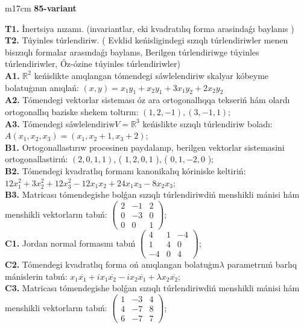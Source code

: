 \documentclass{article}
\begin{document}
\begin{tabular}{m{17cm}}
\textbf{85-variant}
\newline

\textbf{T1.} İnertsiya nızamı. (invariantlar,  eki kvadratılıq forma arasindaǵı baylanıs ) \\
\textbf{T2.} Túyinles túrlendiriw. ( Evklid keńisligindegi sızıqlı túrlendiriwler menen bisızıqlı formalar arasındaǵı baylanıs, Berilgen túrlendiriwge túyinles túrlendiriwler, Óz-ózine túyinles túrlendiriwler) \\
\textbf{A1.} \(\mathbb{R}^{2}\) keńislikte anıqlangan tómendegi sáwlelendiriw skalyar kóbeyme bolatuģının anıqlań: \((x,y) = x_{1}y_{1} + x_{2}y_{1} + 3x_{1}y_{2} + 2x_{2}y_{2}\) \\
\textbf{A2.} Tómendegi vektorlar sisteması óz ara ortogonallıqqa tekseriń hám olardı ortogonallıq baziske shekem toltırın: \((1,2, - 1),(3, - 1,1)\); \\
\textbf{A3.} Tómendegi sáwlelendiriw\(V = \mathbb{R}^{3}\) keńislikte sızıqlı túrlendiriw boladı: \(A\left( x_{1},x_{2},x_{3} \right) = \left( x_{1},x_{2} + 1,x_{3} + 2 \right)\); \\
\textbf{B1.} Ortogonallastırıw procesinen paydalanıp, berilgen vektorlar sistemasini ortogonallastirıń: \((2,0,1,1)\), ( \(1,2,0,1\) ), ( \(0,1, - 2,0\) ); \\
\textbf{B2.} Tómendegi kvadratlıq formanı kanonikalıq kóriniske keltiriń: \(12x_{1}^{2} + 3x_{2}^{2} + 12x_{3}^{2} - 12x_{1}x_{2} + 24x_{1}x_{3} - 8x_{2}x_{3}\); \\
\textbf{B3.} Matricası tómendegishe bolǵan sızıqlı túrlendiriwdiń menshikli mánisi hám menshikli vektorların tabıń: \(\begin{pmatrix} 2 & - 1 & 2 \\ 0 & - 3 & 0 \\ 0 & 0 & 1 \end{pmatrix}\); \\
\textbf{C1.} Jordan normal formasını tabıń \(\begin{pmatrix} 4 & 1 & - 4 \\ 1 & 4 & 0 \\  - 4 & 0 & 4 \end{pmatrix}\); \\
\textbf{C2.} Tómendegi kvadratlıq forma oń anıqlangan bolatuģın\(\lambda\) parametrnıń barlıq mánislerin tabıń: \(x_{1}\overline{x_{1}} + ix_{1}\overline{x_{2}} - ix_{2}\overline{x_{1}} + \lambda x_{2}\overline{x_{2}}\); \\
\textbf{C3.} Matricası tómendegishe bolǵan sızıqlı túrlendiriwdiń menshikli mánisi hám menshikli vektorların tabıń: \(\begin{pmatrix} 1 & - 3 & 4 \\ 4 & - 7 & 8 \\ 6 & - 7 & 7 \end{pmatrix}\); \\

\end{tabular}
\vspace{1cm}
\end{document}
